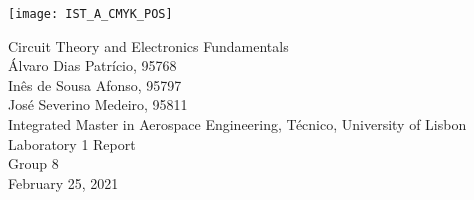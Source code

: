 
\thispagestyle {empty}

\texttt{[image: IST\_A\_CMYK\_POS]}

\begin{center}
%
\vspace{1.0cm}

\vspace{1cm}
{\FontLb Circuit Theory and Electronics Fundamentals} \\ %
\vspace{1.0cm}
{\FontSn Álvaro Dias Patrício, 95768} \\
\vspace{0.5cm}
{\FontSn Inês de Sousa Afonso, 95797} \\
\vspace{0.5cm}
{\FontSn José Severino Medeiro, 95811} \\
\vspace{1.0cm}
{\FontSn Integrated Master in Aerospace Engineering, Técnico, University of Lisbon} \\ %
\vspace{1.0cm}
{\FontSn Laboratory 1 Report} \\
\vspace{0.5cm}
{\FontSn Group 8} \\
\vspace{1.0cm}
{\FontSn February 25, 2021} \\ %
%
\end{center}


